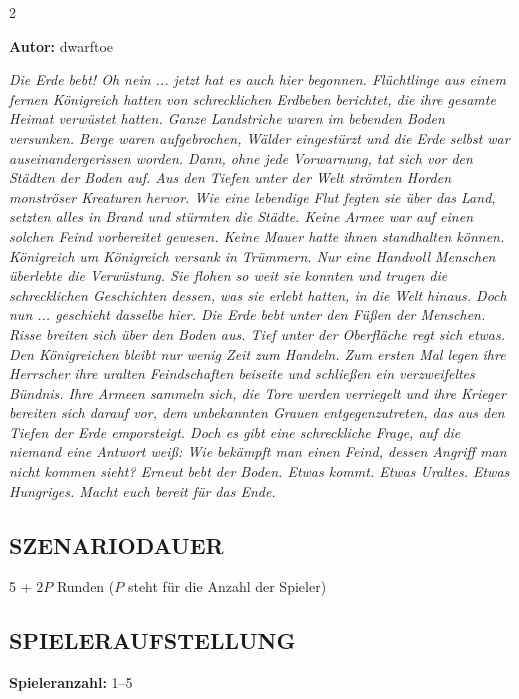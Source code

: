 
\begin{multicols*}{2} 

\textbf{Autor:} dwarftoe 

\textit{Die Erde bebt! Oh nein ... jetzt hat es auch hier begonnen. Flüchtlinge aus einem fernen Königreich hatten von schrecklichen Erdbeben berichtet, die ihre gesamte Heimat verwüstet hatten. Ganze Landstriche waren im bebenden Boden versunken. Berge waren aufgebrochen, Wälder eingestürzt und die Erde selbst war auseinandergerissen worden. Dann, ohne jede Vorwarnung, tat sich vor den Städten der Boden auf. Aus den Tiefen unter der Welt strömten Horden monströser Kreaturen hervor. Wie eine lebendige Flut fegten sie über das Land, setzten alles in Brand und stürmten die Städte. Keine Armee war auf einen solchen Feind vorbereitet gewesen. Keine Mauer hatte ihnen standhalten können. Königreich um Königreich versank in Trümmern. Nur eine Handvoll Menschen überlebte die Verwüstung. Sie flohen so weit sie konnten und trugen die schrecklichen Geschichten dessen, was sie erlebt hatten, in die Welt hinaus. Doch nun ... geschieht dasselbe hier. Die Erde bebt unter den Füßen der Menschen. Risse breiten sich über den Boden aus. Tief unter der Oberfläche regt sich etwas. Den Königreichen bleibt nur wenig Zeit zum Handeln. Zum ersten Mal legen ihre Herrscher ihre uralten Feindschaften beiseite und schließen ein verzweifeltes Bündnis. Ihre Armeen sammeln sich, die Tore werden verriegelt und ihre Krieger bereiten sich darauf vor, dem unbekannten Grauen entgegenzutreten, das aus den Tiefen der Erde emporsteigt. Doch es gibt eine schreckliche Frage, auf die niemand eine Antwort weiß: Wie bekämpft man einen Feind, dessen Angriff man nicht kommen sieht? Erneut bebt der Boden. Etwas kommt. Etwas Uraltes. Etwas Hungriges. Macht euch bereit für das Ende.} 

\subsection*{\MakeUppercase{Szenariodauer}} 5 + $2P$ Runden ($P$ steht für die Anzahl der Spieler)

\subsection*{\MakeUppercase{Spieleraufstellung}} 
\textbf{Spieleranzahl:} 1--5 


\end{multicols*}
